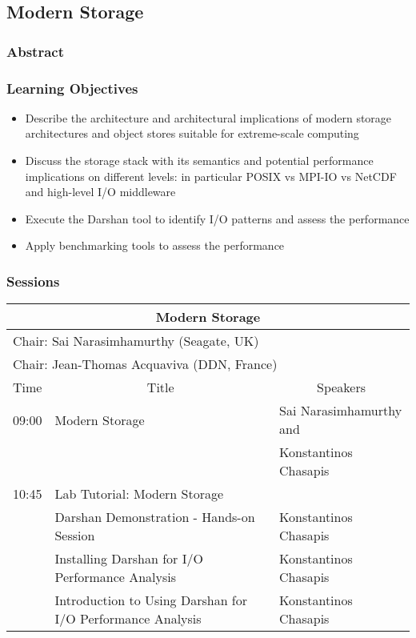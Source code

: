 \subsection{Modern Storage}

\subsubsection{Abstract}

\subsubsection{Learning Objectives}

\begin{itemize}

\item Describe the architecture and architectural implications of modern storage architectures and object stores suitable for extreme-scale computing
\item Discuss the storage stack with its semantics and potential performance implications on different levels: in particular POSIX vs MPI-IO vs NetCDF and high-level I/O middleware
\item Execute the Darshan tool to identify I/O patterns and assess the performance
\item Apply benchmarking tools to assess the performance

\end{itemize}

\subsubsection{Sessions}

\begin{table}[H]
\begin{center}
\begin{tabular}{|l|l|l|}
\hline
\multicolumn{3}{|c|}{\textbf{Modern Storage}} \\ \hline
\multicolumn{3}{|l|}{Chair: Sai Narasimhamurthy (Seagate, UK)} \\
\multicolumn{3}{|l|}{Chair: Jean-Thomas Acquaviva (DDN, France)} \\ \hline \hline
Time & \multicolumn{1}{c|}{Title} & \multicolumn{1}{c|}{Speakers} \\ \hline \hline
09:00 & Modern Storage & Sai Narasimhamurthy and \\
      &                & Konstantinos Chasapis \\ \hline
10:45 & Lab Tutorial: Modern Storage & \\ \hline
      & Darshan Demonstration - Hands-on Session & Konstantinos Chasapis \\ \hline
      & Installing Darshan for I/O Performance Analysis & Konstantinos Chasapis \\ \hline
      & Introduction to Using Darshan for I/O Performance Analysis & Konstantinos Chasapis \\ \hline
\end{tabular}
\end{center}
\end{table}

